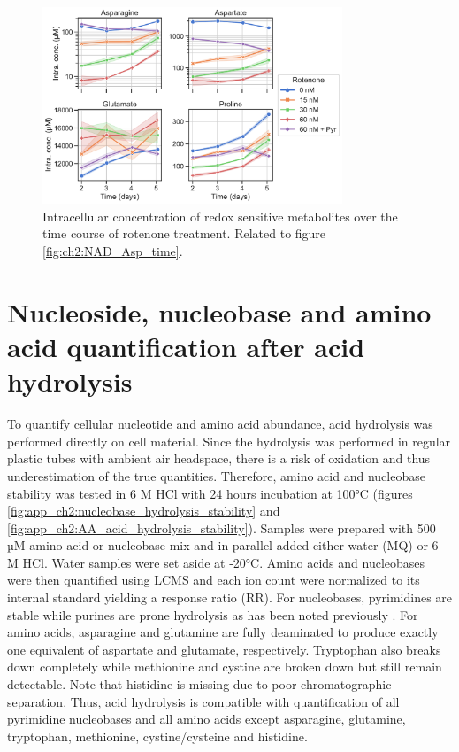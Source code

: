 \begin{figure}[ht]
    \centering
    \includegraphics[width=0.8\textwidth]{figures/chap2/app/Asn-Asp-Glu-Pro-time_rep1.pdf}
    \caption[Redox metabolite over time after rotenone.]{
    Intracellular concentration of redox sensitive metabolites over the time course of rotenone treatment.
    Related to figure \ref{fig:ch2:NAD_Asp_time}.
    }
    \label{fig:ch2:app:Metab_by_day}
\end{figure}




\section{Nucleoside, nucleobase and amino acid quantification after acid hydrolysis}
\label{sec:ch2:app:quant}
To quantify cellular nucleotide and amino acid abundance, acid hydrolysis was performed directly on cell material.
Since the hydrolysis was performed in regular plastic tubes with ambient air headspace, there is a risk of oxidation and thus underestimation of the true quantities.
Therefore, amino acid and nucleobase stability was tested in 6 M HCl with 24 hours incubation at 100°C (figures \ref{fig:app_ch2:nucleobase_hydrolysis_stability} and \ref{fig:app_ch2:AA_acid_hydrolysis_stability}).
Samples were prepared with 500 µM amino acid or nucleobase mix and in parallel added either water (MQ) or 6 M HCl.
Water samples were set aside at -20°C.
Amino acids and nucleobases were then quantified using LCMS and each ion count were normalized to its internal standard yielding a response ratio (RR).
For nucleobases, pyrimidines are stable while purines are prone hydrolysis as has been noted previously \cite{Strecker1861-mh, Wulff1892-og, Hunter1936-iu, Markham1949-qy}.
For amino acids, asparagine and glutamine are fully deaminated to produce exactly one equivalent of aspartate and glutamate, respectively.
Tryptophan also breaks down completely while methionine and cystine are broken down but still remain detectable.
Note that histidine is missing due to poor chromatographic separation.  
Thus, acid hydrolysis is compatible with quantification of all pyrimidine nucleobases and all amino acids except asparagine, glutamine, tryptophan, methionine, cystine/cysteine and histidine.

